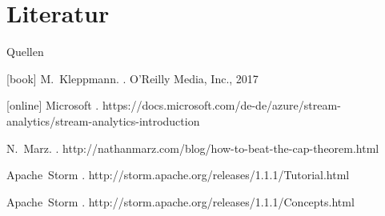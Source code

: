 \documentclass{beamer}
\begin{document}
\section{Literatur}
\begin{frame}[t]{Quellen}
  \begin{thebibliography}{Kleppmann, 2017}
      [book]
      M.~Kleppmann.
      .
      \newblock \small{O'Reilly Media, Inc., 2017}

      [online]
      Microsoft
      .
      \newblock https://docs.microsoft.com/de-de/azure/stream-analytics/stream-analytics-introduction 

      N.~Marz.
      .
      \newblock http://nathanmarz.com/blog/how-to-beat-the-cap-theorem.html 

      Apache~Storm
      .
      \newblock http://storm.apache.org/releases/1.1.1/Tutorial.html 

      Apache~Storm
      .
      \newblock http://storm.apache.org/releases/1.1.1/Concepts.html

  \end{thebibliography}
\end{frame}
\end{document}
